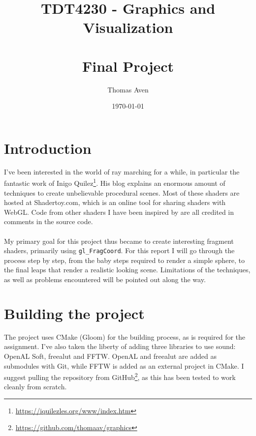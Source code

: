 \documentclass[abstract=off,oneside]{scrreprt}
\author{Thomas Aven}
\date{\today}
\title{TDT4230 - Graphics and Visualization \large \\~\\ Final Project}
\begin{document}
\maketitle

\section*{Introduction}
\label{sec-1}
I've been interested in the world of ray marching for a while, in
particular the fantastic work of Inigo Quilez\footnote{\url{https://iquilezles.org/www/index.htm}}. His blog explains
an enormous amount of techniques to create unbelievable procedural
scenes. Most of these shaders are hosted at Shadertoy.com, which is an
online tool for sharing shaders with WebGL. Code from other shaders I
have been inspired by are all credited in comments in the source code.
\\\\
My primary goal for this project thus became to create interesting
fragment shaders, primarily using \verb~gl_FragCoord~.  For this report I
will go through the process step by step, from the baby steps required
to render a simple sphere, to the final leaps that render a realistic
looking scene. Limitations of the techniques, as well as problems
encountered will be pointed out along the way.

\section*{Building the project}
\label{sec-2}
The project uses CMake (Gloom) for the building process, as is
required for the assignment. I've also taken the liberty of adding
three libraries to use sound: OpenAL Soft, freealut and FFTW. OpenAL
and freealut are added as submodules with Git, while FFTW is added as
an external project in CMake. I suggest pulling the repository from
GitHub\footnote{\url{https://github.com/thomaav/graphics}}, as this has been tested to work cleanly from scratch.
\end{document}
